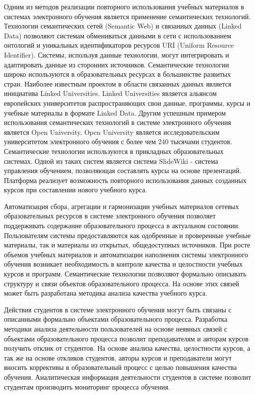 Одним из методов реализации повторного использования учебных материалов в системах электронного обучения является применение семантических технологий. Технологии семантических сетей (Semantic Web) и связанных данных (Linked Data) позволяют системам обмениваться данными в сети с использованием онтологий и уникальных идентификаторов ресурсов URI (Uniform Resource Identifier). Системы, используя данные технологии, могут интегрировать и адаптировать данные из сторонних источников. Семантические технологии широко используются в образовательных ресурсах в большинстве развитых стран. Наиболее известным проектом в области связанных данных является инициатива Linked Universities. Linked Universities является альянсом европейских университетов распространяющих свои данные, программы, курсы и учебные материалы в формате Linked Data. Другим успешным примером использования семантических технологий в системе электронного обучения является Open University. Open University является исследовательским университетом электронного обучения с более чем 240 тысячами студентов. Семантические технологии используются в прикладных образовательных системах. Одной из таких систем является система SlideWiki - система управления обучением, позволяющая составлять курсы на основе презентаций. Платформа реализует возможность повторного использования данных созданных курсов при составлении нового учебного курса.

Автоматизация сбора, агрегации и гармонизации учебных материалов сетевых образовательных ресурсов в системе электронного обучения позволяет поддерживать содержание образовательного процесса в актуальном состоянии. Пользователям системы предоставляются как одобренные и проверенные учебные материалы, так и материалы из открытых, общедоступных источников. При росте объемов учебных материалов и автоматизации наполнения системы электронного обучения возникает необходимость в контроле качества и целостности учебных курсов и программ. Семантические технологии позволяют формально описывать структуру и связи объектов образовательного процесса. На основе этих связей может быть разработана методика анализа качества учебного курса. 

Действия студентов в системе электронного обучения могут быть связаны с описанными формально объектами образовательного процесса. Разработка методики анализа деятельности пользователей на основе неявных связей с объектами образовательного процесса позволит преподавателям и авторам курсов получить отклик от студентов. На основе анализа качества, целостности курсов, а так же на основе откликов студентов, авторы курсов и преподаватели могут вносить коррективы в образовательный процесс с целью повышения качества обучения. Аналитическая информация деятельности студентов в системе позволит студентам производить мониторинг процесса обучения.     

